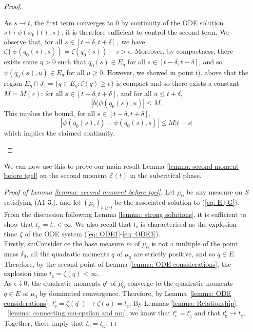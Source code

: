 \begin{proof}
\begin{enumerate}[label=\roman{*}).]
\begin{equation}
\end{equation} As $s\rightarrow t$, the first term converges to $0$ by continuity of the ODE solution $s\mapsto \psi(x_0(t),s)$; it is therefore sufficient to control the second term. We observe that, for all $s\in[t-\delta, t+\delta],$ we have $\zeta(\psi(q_0(s),s))=\zeta(q_0(s))-s>\epsilon$. Moreover, by compactness, there exists some $\eta>0$ such that $q_0(s) \in E_\eta$ for all $s\in [t-\delta, t+\delta]$, and so $\psi(q_0(s),u)\in E_\eta$ for all $u\ge 0.$ However, we showed in point i). above that the region $E_\eta \cap J_\epsilon=\{q \in E_\eta: \zeta(q)\geq\epsilon\}$ is compact  and so there exists a constant $M=M(\epsilon)$: for all $s\in[t-\delta, t+\delta]$, and for all $u \le t+\delta$, \begin{equation} |b(\psi(q_0(s), u)| \le M. \end{equation}
This implies the bound, for all $s\in[t-\delta,t+\delta]$, \begin{equation} |\psi(q_0(s), t)-\psi(q_0(s), s)| \le M|t-s|\end{equation} which implies the claimed continuity.
\end{enumerate}  \end{proof}



We can now use this to prove our main result Lemma \ref{lemma: second moment before tgel} on the second moment $\mathcal{E}(t)$ in the subcritical phase.





\begin{proof}[Proof of Lemma \ref{lemma: second moment before tgel}]
Let $\mu_0$ be any measure on $S$ satisfying ({A1}-{3}.), and let $(\mu_t)_{t\ge 0}$ be the associated solution to (\ref{eq: E+G}). From the discussion following Lemma \ref{lemma: strong solutions}, it is sufficient to show that $t_\mathrm{g}=t_\mathrm{e}<\infty$. We also recall that $t_\mathrm{e}$ is characterised as the explosion time $\zeta$ of the ODE system (\ref{eq: ODE1}-\ref{eq: ODE3}). \medskip \\ Firstly, sinConsider ce the base measure $m$ of $\mu_0$ is not a multiple of the point mass $\delta_0$, all the quadratic moments $q$ of $\mu_0$ are strictly positive, and so $q \in E$. Therefore, by the second point of Lemma \ref{lemma: ODE considerations}, the explosion time $t_\mathrm{e}=\zeta(q)<\infty.$\medskip \\ 
As $\epsilon \downarrow 0$, the quadratic moments $q^\epsilon$ of $\mu^\epsilon_0$ converge to the quadratic moments $q\in E$ of $\mu_0$ by dominated convergence.  Therefore, by Lemma~\ref{lemma: ODE considerations},  $t^\epsilon_\mathrm{e}=\zeta(q^\epsilon)\rightarrow \zeta(q)= t_\mathrm{e}$.
By Lemmas \ref{lemma: Relationship}, ~\ref{lemma: connecting mu-epsilon and mu}, we know that $t_\mathrm{e}^\epsilon=t_\mathrm{g}^\epsilon$ and that $t_\mathrm{g}^\epsilon \rightarrow t_\mathrm{g}$. Together, these imply that $t_\mathrm{e} = t_\mathrm{g}$.

\end{proof} 


\fi
